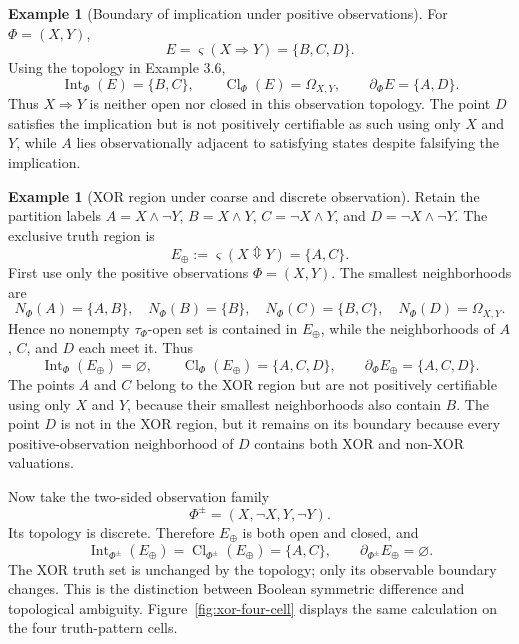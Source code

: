 \documentclass[11pt]{article}
\theoremstyle{definition}
\newtheorem{example}[definition]{Example}
\theoremstyle{plain}
\theoremstyle{remark}
\newcommand{\Int}{\operatorname{Int}}
\newcommand{\Cl}{\operatorname{Cl}}
\newcommand{\bd}{\partial}
\begin{document}
\begin{example}[Boundary of implication under positive observations]
For $\Phi=(X,Y)$,
\[
 E=\varsigma(X\Rightarrow Y)=\{B,C,D\}.
\]
Using the topology in Example 3.6,
\[
 \Int_\Phi(E)=\{B,C\},\qquad
 \Cl_\Phi(E)=\Omega_{X,Y},\qquad
 \bd_\Phi E=\{A,D\}.
\]
Thus $X\Rightarrow Y$ is neither open nor closed in this observation topology.
The point $D$ satisfies the implication but is not positively certifiable as
such using only $X$ and $Y$, while $A$ lies observationally adjacent to
satisfying states despite falsifying the implication.
\end{example}

\begin{example}[XOR region under coarse and discrete observation]
Retain the partition labels $A=X\wedge\neg Y$,
$B=X\wedge Y$, $C=\neg X\wedge Y$, and
$D=\neg X\wedge\neg Y$.  The exclusive truth region is
\[
 E_\oplus:=\varsigma(X\Updownarrow Y)=\{A,C\}.
\]
First use only the positive observations $\Phi=(X,Y)$.  The smallest
neighborhoods are
\[
 N_\Phi(A)=\{A,B\},\quad N_\Phi(B)=\{B\},\quad
 N_\Phi(C)=\{B,C\},\quad N_\Phi(D)=\Omega_{X,Y}.
\]
Hence no nonempty $\tau_\Phi$-open set is contained in $E_\oplus$, while the
neighborhoods of $A$, $C$, and $D$ each meet it.  Thus
\[
 \Int_\Phi(E_\oplus)=\varnothing,\qquad
 \Cl_\Phi(E_\oplus)=\{A,C,D\},\qquad
 \bd_\Phi E_\oplus=\{A,C,D\}.
\]
The points $A$ and $C$ belong to the XOR region but are not positively
certifiable using only $X$ and $Y$, because their smallest neighborhoods also
contain $B$.  The point $D$ is not in the XOR region, but it remains on its
boundary because every positive-observation neighborhood of $D$ contains both
XOR and non-XOR valuations.

Now take the two-sided observation family
\[
 \Phi^{\pm}=(X,\neg X,Y,\neg Y).
\]
Its topology is discrete.  Therefore $E_\oplus$ is both open and closed, and
\[
 \Int_{\Phi^{\pm}}(E_\oplus)
 =\Cl_{\Phi^{\pm}}(E_\oplus)
 =\{A,C\},
 \qquad
 \bd_{\Phi^{\pm}}E_\oplus=\varnothing.
\]
The XOR truth set is unchanged by the topology; only its observable boundary
changes.  This is the distinction between Boolean symmetric difference and topological
ambiguity.  Figure~\ref{fig:xor-four-cell} displays the same calculation on
the four truth-pattern cells.
\end{example}
\end{document}
